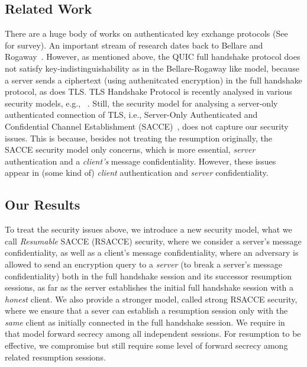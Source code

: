 \documentclass[11pt,a4j]{jarticle}
\begin{document}
\subsection{Related Work} \label{sec:Related Work}
There are a huge body of works on authenticated key exchange protocols
(See~\cite{CK01:AKE} for survey).
An important stream of research dates back to Bellare and Rogaway~\cite{BR93:AKE}.
However, as mentioned above,
the QUIC full handshake protocol does not satisfy key-indistinguishability as in the Bellare-Rogaway like model, because a server sends a ciphertext (using authenitcated encryption) in the full handshake protocol, as does TLS.
TLS Handshake Protocol is recently analysed in various security models, e.g., ~\cite{JKSS12:ACCE,KPW13:SACCE,FS13:ACCE,GKS13:RACCE,BDKSS14:SSH,BFKPSB14:TLS}.
Still,
the security model for analysing a server-only authenticated connection of TLS,
i.e., Server-Only Authenticated and Confidential Channel Establishment
(SACCE)~\cite{KPW13:SACCE}, does not capture our security issues.
This is because, besides not treating the resumption originally,
the SACCE security model only concerns, which is more essential,
\textit{server} authentication and a \textit{client's} message confidentiality.
However, these issues appear in (some kind of) \textit{client} authentication
and \textit{server} confidentiality.

\subsection{Our Results} \label{sec:proposal}

To treat the security issues above,
we introduce a new security model, what we call \textit{Resumable} SACCE (RSACCE) security,
where we consider a server's message confidentiality, as well as a client's message confidentiality,
where an adversary is allowed to send an encryption query to a \textit{server}
(to break a server's message confidentiality)
both in the full handshake session and its successor resumption sessions,
as far as the server establishes the initial full handshake session
with a \textit{honest} client.
We also provide a stronger model, called strong RSACCE security,
where we ensure that a sever can establish a resumption session only with the \textit{same} client as
initially connected in the full handshake session.
We require in that model forward secrecy among all independent sessions.
For resumption to be effective, we compromise but still require
some level of forward secrecy among related resumption sessions.
\end{document}
